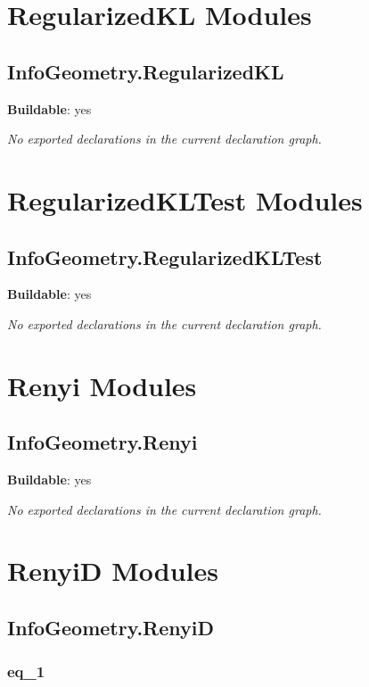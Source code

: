 \chapter{RegularizedKL Modules}

\section{InfoGeometry.RegularizedKL}

\noindent\textbf{Buildable}: yes

\noindent\emph{No exported declarations in the current declaration graph.}

\chapter{RegularizedKLTest Modules}

\section{InfoGeometry.RegularizedKLTest}

\noindent\textbf{Buildable}: yes

\noindent\emph{No exported declarations in the current declaration graph.}

\chapter{Renyi Modules}

\section{InfoGeometry.Renyi}

\noindent\textbf{Buildable}: yes

\noindent\emph{No exported declarations in the current declaration graph.}

\chapter{RenyiD Modules}

\section{InfoGeometry.RenyiD}

\subsection*{eq_1}

